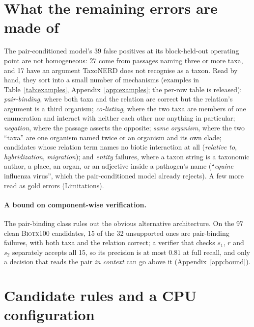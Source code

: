 \documentclass[11pt]{article}
\begin{document}
\section{What the remaining errors are made of}
\label{sec:errors}
\label{sec:decomp}

The pair-conditioned model's 39 false positives at its block-held-out operating point are not
homogeneous: 27 come from passages naming three or more taxa, and 17 have an argument TaxoNERD does
not recognise as a taxon. Read by hand, they sort into a small number of mechanisms
(examples in Table~\ref{tab:examples}, Appendix~\ref{app:examples}; the per-row table is released): \emph{pair-binding},
where both taxa and the relation are correct but the relation's argument is a third organism;
\emph{co-listing}, where the two taxa are members of one enumeration and interact with neither each
other nor anything in particular; \emph{negation}, where the passage asserts the opposite;
\emph{same organism}, where the two ``taxa'' are one organism named twice or an organism and its own
clade; candidates whose relation term names no biotic interaction at all (\emph{relative to},
\emph{hybridization}, \emph{migration}); and \emph{entity} failures, where a taxon string is a
taxonomic author, a place, an organ, or an adjective inside a pathogen's name (``\emph{equine}
influenza virus'', which the pair-conditioned model already rejects). A few more read as gold errors (Limitations).

\paragraph{A bound on component-wise verification.}
The pair-binding class rules out the obvious alternative architecture. On the 97 clean
\textsc{Biotx100} candidates, 15 of the 32 unsupported ones are pair-binding failures, with both taxa
and the relation correct; a verifier that checks $s_1$, $r$ and $s_2$ separately accepts all 15, so
its precision is at most $0.81$ at full recall, and only a decision that reads the pair \emph{in
context} can go above it (Appendix~\ref{app:bound}).

\section{Candidate rules and a CPU configuration}
\label{sec:rules}
\label{sec:deploy}
\end{document}
